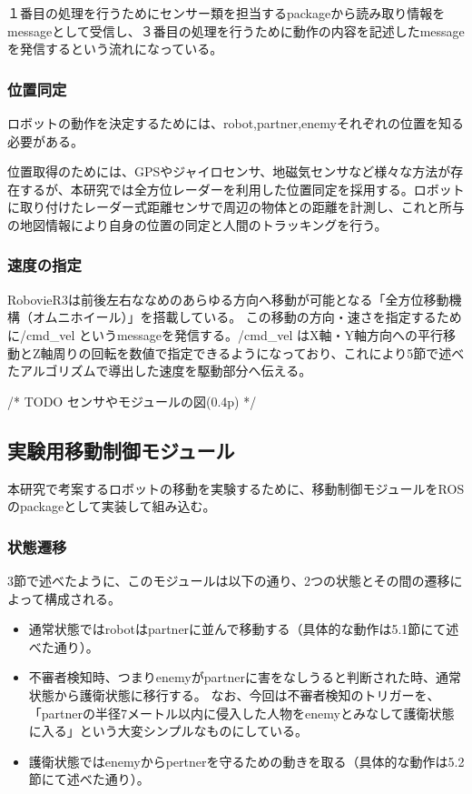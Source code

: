 \documentclass{kuisthesis}
\begin{document}
１番目の処理を行うためにセンサー類を担当するpackageから読み取り情報をmessageとして受信し、３番目の処理を行うために動作の内容を記述したmessageを発信するという流れになっている。

\vspace{1.0em}

\subsubsection*{位置同定}
ロボットの動作を決定するためには、robot,partner,enemyそれぞれの位置を知る必要がある。

位置取得のためには、GPSやジャイロセンサ、地磁気センサなど様々な方法が存在するが、本研究では全方位レーダーを利用した位置同定を採用する。ロボットに取り付けたレーダー式距離センサで周辺の物体との距離を計測し、これと所与の地図情報により自身の位置の同定と人間のトラッキングを行う。

\vspace{1.0em}

\subsubsection*{速度の指定}
RobovieR3は前後左右ななめのあらゆる方向へ移動が可能となる「全方位移動機構（オムニホイール）」を搭載している。
この移動の方向・速さを指定するために/cmd\_vel というmessageを発信する。/cmd\_vel はX軸・Y軸方向への平行移動とZ軸周りの回転を数値で指定できるようになっており、これにより5節で述べたアルゴリズムで導出した速度を駆動部分へ伝える。

/* TODO センサやモジュールの図(0.4p) */

\subsection{実験用移動制御モジュール}

本研究で考案するロボットの移動を実験するために、移動制御モジュールをROSのpackageとして実装して組み込む。

\vspace{1.0em}

\subsubsection*{状態遷移}
3節で述べたように、このモジュールは以下の通り、2つの状態とその間の遷移によって構成される。
\begin{itemize}
	\item 通常状態ではrobotはpartnerに並んで移動する（具体的な動作は5.1節にて述べた通り）。
	\item 不審者検知時、つまりenemyがpartnerに害をなしうると判断された時、通常状態から護衛状態に移行する。
	なお、今回は不審者検知のトリガーを、「partnerの半径7メートル以内に侵入した人物をenemyとみなして護衛状態に入る」という大変シンプルなものにしている。
	\item 護衛状態ではenemyからpertnerを守るための動きを取る（具体的な動作は5.2節にて述べた通り）。
\end{itemize}
\end{document}
